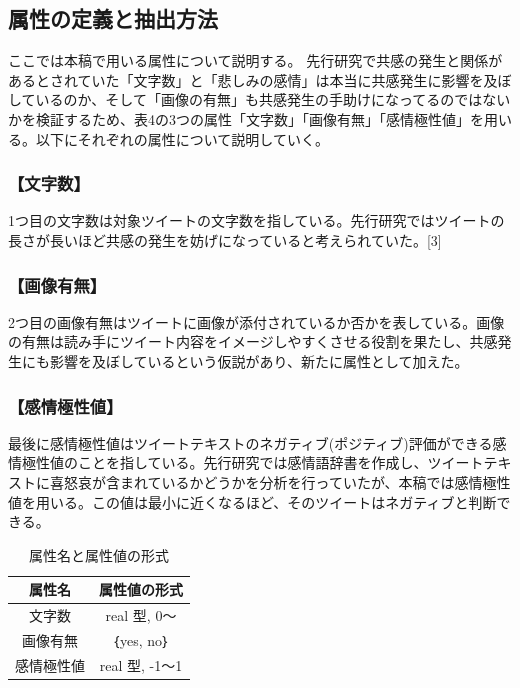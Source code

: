 \documentclass[dvipdfmx]{issj}
\begin{document}
\subsection{属性の定義と抽出方法}  %
ここでは本稿で用いる属性について説明する。
先行研究で共感の発生と関係があるとされていた「文字数」と「悲しみの感情」は本当に共感発生に影響を及ぼしているのか、そして「画像の有無」も共感発生の手助けになってるのではないかを検証するため、表4の3つの属性「文字数」「画像有無」「感情極性値」を用いる。以下にそれぞれの属性について説明していく。


\subsubsection{【文字数】}
1つ目の文字数は対象ツイートの文字数を指している。先行研究ではツイートの長さが長いほど共感の発生を妨げになっていると考えられていた。[3]

\subsubsection{【画像有無】}
2つ目の画像有無はツイートに画像が添付されているか否かを表している。画像の有無は読み手にツイート内容をイメージしやすくさせる役割を果たし、共感発生にも影響を及ぼしているという仮説があり、新たに属性として加えた。

\subsubsection{【感情極性値】}
最後に感情極性値はツイートテキストのネガティブ(ポジティブ)評価ができる感情極性値のことを指している。先行研究では感情語辞書を作成し、ツイートテキストに喜怒哀が含まれているかどうかを分析を行っていたが、本稿では感情極性値を用いる。この値は最小に近くなるほど、そのツイートはネガティブと判断できる。

\begin{table}[t]\centering
\caption{属性名と属性値の形式}\label{tbl:font}
\begin{small}
\begin{tabular}{c|c} \hline\hline
属性名            & 属性値の形式\\\hline
文字数         & real 型, 0～\\
画像有無 & ｛yes, no｝\\
感情極性値     &  real 型, -1～1\\\hline
\end{tabular}
\end{small}
\end{table}
\end{document}
